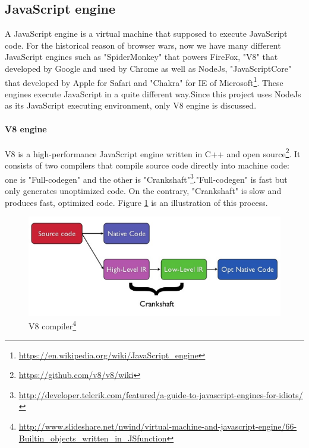     \subsection{JavaScript engine}
    A JavaScript engine is a virtual machine that supposed to execute JavaScript code. For the historical reason of browser wars, now we have many different JavaScript engines such as "SpiderMonkey" that powers FireFox, "V8" that developed by Google and used by Chrome as well as NodeJs, "JavaScriptCore" that developed by Apple for Safari and "Chakra" for IE of Microsoft\footnote{\url{https://en.wikipedia.org/wiki/JavaScript_engine}}. These engines execute JavaScript in a quite different way.Since this project uses NodeJs as its JavaScript executing environment, only V8 engine is discussed.
    
    \paragraph{V8 engine} V8 is a high-performance JavaScript engine written in C++ and open source\footnote{\label{foot:v8git}\url{https://github.com/v8/v8/wiki}}. It consists of two compilers that compile source code directly into machine code: one is "Full-codegen" and the other is "Crankshaft"\footnote{\label{foot:v8Intro}\url{http://developer.telerik.com/featured/a-guide-to-javascript-engines-for-idiots/}}."Full-codegen" is fast but only generates unoptimized code. On the contrary, "Crankshaft" is slow and produces fast, optimized code. Figure \ref{fig:V8compiler} is an illustration of this process.
    
        \begin{figure}[H]
            \centering
            \includegraphics[scale = 0.4]
            {Images/concepts/v8.png}
            \caption[V8compiler]%
            {V8 compiler\footnote{\url{http://www.slideshare.net/nwind/virtual-machine-and-javascript-engine/66-Builtin_objects_written_in_JSfunction}}}  
            \label{fig:V8compiler}
        \end{figure}
        
